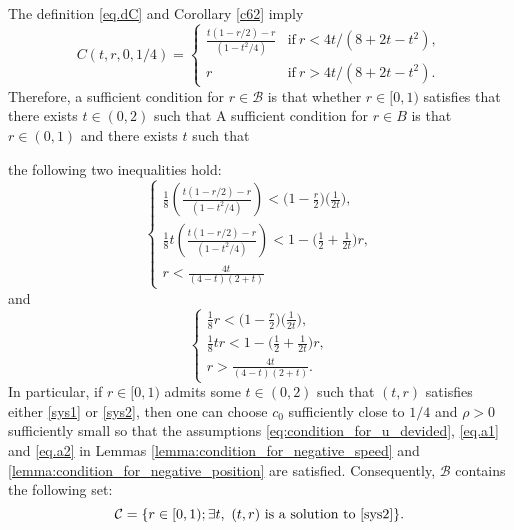 \documentclass[reqno]{amsart}
\begin{document}
The definition \eqref{eq.dC} and Corollary \ref{c62} imply
	\begin{equation}
	C(t,r,0,1/4) =
	\begin{cases}
	\frac{t(1-r/2)-r }{(1-t^2/4)}
	& \mbox{if} \ r < 4t/(8+2t-t^2),\\
	r
	& \mbox{if} \ r > 4t/(8+2t-t^2).
	\end{cases}
	\end{equation}
Therefore, a sufficient condition for $r \in \mathcal B$
is that whether $r \in [0,1)$ satisfies
that there exists $t \in (0,2)$ such that
{\color{blue} A sufficient condition for 
$r\in B$
is that 
$r \in (0,1)$
and there exists $t$
such that 
}



the following two inequalities hold:
	\begin{equation}\label{sys1}
	\begin{cases}
	\frac{1}{8}  \left(\frac{t(1-r/2)-r }{(1-t^2/4)}  \right)
	< \bigg(1 - \frac{r}{2}  \bigg) \bigg( \frac{1}{2t} \bigg),\\
	\frac{1}{8} t  \left(\frac{t(1-r/2)-r }{(1-t^2/4)}  \right)
	< 1 - \bigg( \frac{1}{2} + \frac{1}{2t}\bigg) r,\\
	r
	< \frac{4t}{(4-t)(2+t)}
	\end{cases}
	\end{equation}
and
	\begin{equation}\label{sys2}
	\begin{cases}
	\frac{1}{8}  r
	< \bigg(1 - \frac{r}{2}  \bigg) \bigg( \frac{1}{2t} \bigg),\\
	\frac{1}{8} t  r
	< 1 - \bigg( \frac{1}{2} + \frac{1}{2t}\bigg) r,\\
	r > \frac{4t}{(4-t)(2+t)}.
	\end{cases}
	\end{equation}
In particular, if $r \in [0,1)$ admits some $t \in (0,2)$
such that $(t,r)$ satisfies either \eqref{sys1} or \eqref{sys2},
then one can choose $c_0$ sufficiently close to $1/4$
and $\rho>0$ sufficiently small
so that the assumptions \eqref{eq:condition_for_u_devided}, \eqref{eq.a1} and \eqref{eq.a2}
in Lemmas \ref{lemma:condition_for_negative_speed}
and \ref{lemma:condition_for_negative_position} are satisfied.
Consequently,
$\mathcal B$ contains the following set:
	\[
	\mathcal C
	= \{r \in [0,1); \exists t, \ (t,r) \ \mbox{is a solution to \eqref{sys2}}\}.
	\]
\end{document}
